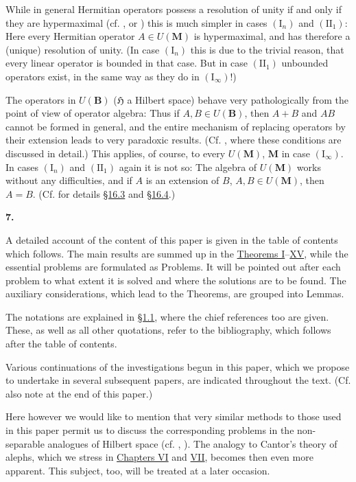 \documentclass[12pt,b5paper,twoside]{article}
\newcommand{\Hspace}{\mathfrak H}
\newcommand{\M}{\mathbf M}
\newcommand{\B}{\mathbf B}
\newcommand{\IntroStart}[2]{%
  \par\medskip
  \phantomsection\label{intro:#1}%
  \addcontentsline{toc}{subsection}{#1. #2}%
  \noindent\textbf{#1.}\enspace
}
\newcommand{\secref}[1]{\hyperref[sec:#1]{\S#1}}
\begin{document}
While in general Hermitian operators possess a resolution of unity if and only
if they are hypermaximal (cf. \cite[p.~92]{ref16}, or
\cite[Theorem 9.3, p.~339]{ref15}) this is much simpler in cases
$(\mathrm I_n)$ and $(\mathrm{II}_1)$: Here every Hermitian operator
$A\in U(\M)$ is hypermaximal, and has therefore a (unique) resolution of unity.
(In case $(\mathrm I_n)$ this is due to the trivial reason, that every linear
operator is bounded in that case. But in case $(\mathrm{II}_1)$ unbounded
operators exist, in the same way as they do in $(\mathrm I_\infty)$!)

The operators in $U(\B)$ ($\Hspace$ a Hilbert space) behave very pathologically
from the point of view of operator algebra: Thus if $A,B\in U(\B)$, then $A+B$
and $AB$ cannot be formed in general, and the entire mechanism of replacing
operators by their extension leads to very paradoxic results.
(Cf. \cite[pp.~230--234]{ref17}, where these conditions are discussed in
detail.) This applies, of course, to every $U(\M)$, $\M$ in case
$(\mathrm I_\infty)$. In cases $(\mathrm I_n)$ and $(\mathrm{II}_1)$ again it is
not so: The algebra of $U(\M)$ works without any difficulties, and if $A$ is an
extension of $B$, $A,B\in U(\M)$, then $A=B$. (Cf. for details \secref{16.3}
and \secref{16.4}.)

\IntroStart{7}{Outline}
A detailed account of the content of this paper is given in the table of contents
which follows. The main results are summed up in the
\hyperref[thm:I]{Theorems I}--\hyperref[thm:XV]{XV}, while
the essential problems are formulated as Problems. It will be pointed out after
each problem to what extent it is solved and where the solutions are to be
found. The auxiliary considerations, which lead to the Theorems, are grouped
into Lemmas.

The notations are explained in \secref{1.1}, where the chief references too are
given. These, as well as all other quotations, refer to the bibliography, which
follows after the table of contents.

Various continuations of the investigations begun in this paper, which we
propose to undertake in several subsequent papers, are indicated throughout the
text. (Cf. also note at the end of this paper.)

Here however we would like to mention that very similar methods to those used
in this paper permit us to discuss the corresponding problems in the
non-separable analogues of Hilbert space (cf. \cite{ref11}, \cite{ref13}). The analogy
to Cantor's theory of alephs, which we stress in
\hyperref[chap:6]{Chapters VI} and \hyperref[chap:7]{VII}, becomes
then even more apparent. This subject, too, will be treated at a later occasion.
\end{document}
